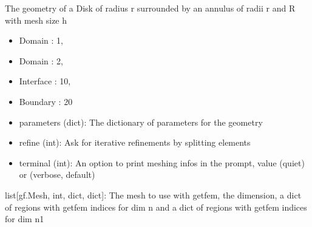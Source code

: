 \documentclass[letterpaper,10pt,english]{sphinxmanual}
\begin{document}
\begin{fulllineitems}
\label{\detokenize{scrimp.utils:scrimp.utils.mesh.Concentric}}
\pysigstartsignatures
\pysiglinewithargsret
{}
{\sphinxparamcomma {}\sphinxparamcomma {}\sphinxparamcomma {}}
{}
\pysigstopsignatures
\sphinxAtStartPar
The geometry of a Disk of radius r surrounded by an annulus of radii r and R with mesh size h
\begin{itemize}
\item {} 
\sphinxAtStartPar
Domain : 1,

\item {} 
\sphinxAtStartPar
Domain : 2,

\item {} 
\sphinxAtStartPar
Interface : 10,

\item {} 
\sphinxAtStartPar
Boundary : 20

\end{itemize}
\begin{description}
\begin{itemize}
\item {} 
\sphinxAtStartPar
parameters (dict): The dictionary of parameters for the geometry

\item {} 
\sphinxAtStartPar
refine (int): Ask for iterative refinements by splitting elements

\item {} 
\sphinxAtStartPar
terminal (int): An option to print meshing infos in the prompt, value  (quiet) or  (verbose, default)

\end{itemize}

\sphinxAtStartPar
list{[}gf.Mesh, int, dict, dict{]}: The mesh to use with getfem, the dimension, a dict of regions with getfem indices for dim n and a dict of regions with getfem indices for dim n\sphinxhyphen{}1

\end{description}

\end{fulllineitems}
\end{document}
